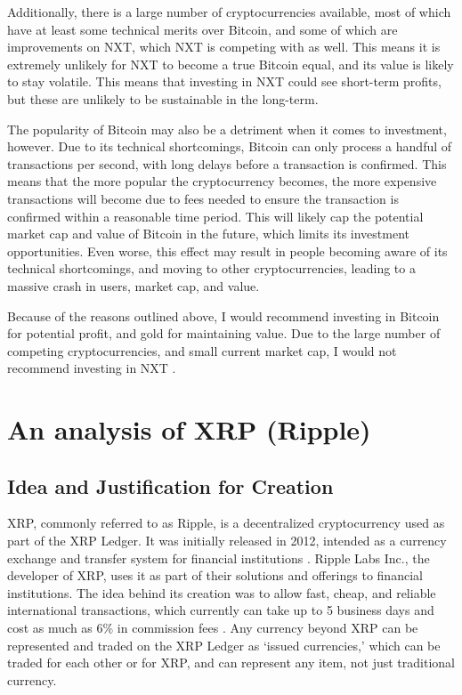 \documentclass[11pt,a4paper]{article}
\begin{document}
	Additionally, there is a large number of cryptocurrencies available, most of which have at least some technical merits over Bitcoin, and some of which are improvements on NXT, which NXT is competing with as well. This means it is extremely unlikely for NXT to become a true Bitcoin equal, and its value is likely to stay volatile. This means that investing in NXT could see short-term profits, but these are unlikely to be sustainable in the long-term.
	
	The popularity of Bitcoin may also be a detriment when it comes to investment, however. Due to its technical shortcomings, Bitcoin can only process a handful of transactions per second, with long delays before a transaction is confirmed. This means that the more popular the cryptocurrency becomes, the more expensive transactions will become due to fees needed to ensure the transaction is confirmed within a reasonable time period. This will likely cap the potential market cap and value of Bitcoin in the future, which limits its investment opportunities. Even worse, this effect may result in people becoming aware of its technical shortcomings, and moving to other cryptocurrencies, leading to a massive crash in users, market cap, and value.
	
	Because of the reasons outlined above, I would recommend investing in Bitcoin for potential profit, and gold for maintaining value. Due to the large number of competing cryptocurrencies, and small current market cap, I would not recommend investing in NXT \cite{coinmarketcap}.
	
	\pagebreak
	
	\section{An analysis of XRP (Ripple)}
	
	\subsection{Idea and Justification for Creation}
	
	XRP, commonly referred to as Ripple, is a decentralized cryptocurrency used as part of the XRP Ledger. It was initially released in 2012, intended as a currency exchange and transfer system for financial institutions \cite{finder}. Ripple Labs Inc., the developer of XRP, uses it as part of their solutions and offerings to financial institutions. The idea behind its creation was to allow fast, cheap, and reliable international transactions, which currently can take up to 5 business days and cost as much as 6\% in commission fees \cite{topcryptocurrencies}. Any currency beyond XRP can be represented and traded on the XRP Ledger as `issued currencies,' which can be traded for each other or for XRP, and can represent any item, not just traditional currency.
	
\end{document}

